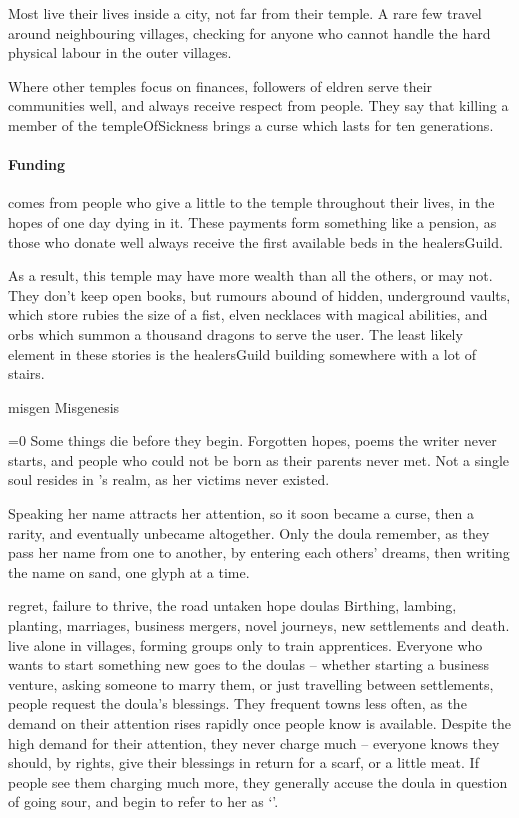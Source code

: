 \begin{multicols}{2}
Most live their lives inside a city, not far from their temple.
A rare few travel around neighbouring \glspl{village}, checking for anyone who cannot handle the hard physical labour in the outer \glspl{village}.

Where other temples focus on finances, followers of \gls{eldren} serve their communities well, and always receive respect from people.
They say that killing a member of the \gls{templeOfSickness} brings a curse which lasts for ten generations.

\paragraph{Funding}
comes from people who give a little to the temple throughout their lives, in the hopes of one day dying in it.
These payments form something like a pension, as those who donate well always receive the first available beds in the \gls{healersGuild}.

As a result, this temple may have more wealth than all the others, or may not.
They don't keep open books, but rumours abound of hidden, underground vaults, which store rubies the size of a fist, elven necklaces with magical abilities, and orbs which summon a thousand dragons to serve the user.
The least likely element in these stories is the \gls{healersGuild} building somewhere with a lot of stairs.

\guild{\hphantom{Nulla}}%
  {\gls{misgen}}%
  {Misgenesis}%
  {
  \ifnum\value{temperature}=0\fi
  Some things die before they begin.
  Forgotten hopes, poems the writer never starts, and people who could not be born as their parents never met.
  Not a single soul resides in \hphantom{Nulla}'s realm, as her victims never existed.

  Speaking her name attracts her attention, so it soon became a curse, then a rarity, and eventually unbecame altogether.
  Only the \gls{doula} remember, as they pass her name from one to another, by entering each others' dreams, then writing the name on sand, one glyph at a time.
  }%
  {regret, failure to thrive, the road untaken}%
  {hope}%
  {\Glspl{doula}}%
  {
    Birthing, lambing, planting, marriages, business mergers, novel journeys, new settlements and death.
  }%
live alone in \glspl{village}, forming groups only to train apprentices.
Everyone who wants to start something new goes to the \glspl{doula} -- whether starting a business venture, asking someone to marry them, or just travelling between settlements, people request the \gls{doula}'s blessings.
They frequent towns less often, as the demand on their attention rises rapidly once people know  is available.
Despite the high demand for their attention, they never charge much -- everyone knows they should, by rights, give their blessings in return for a scarf, or a little meat.
If people see them charging much more, they generally accuse the \gls{doula} in question of going sour, and begin to refer to her as `'.


\end{multicols}
